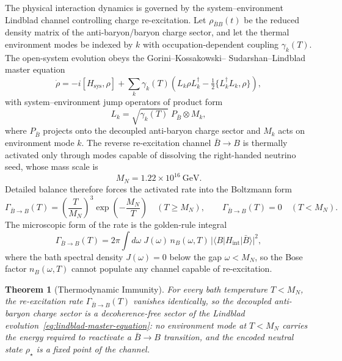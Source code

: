 \documentclass[11pt,letterpaper]{article}
\theoremstyle{plain}
\newtheorem{theorem}{Theorem}
\begin{document}
The physical interaction dynamics is governed by the system--environment Lindblad channel
controlling charge re-excitation.  Let \(\rho_{\bar B B}(t)\) be the reduced
density matrix of the anti-baryon/baryon charge sector, and let the thermal
environment modes be indexed by \(k\) with occupation-dependent coupling
\(\gamma_k(T)\).  The open-system evolution obeys the Gorini--Kossakowski--
Sudarshan--Lindblad master equation
\begin{equation}
\label{eq:lindblad-master-equation}
 \dot\rho
 =
 -i[H_{\mathrm{sys}},\rho]
 +
 \sum_k
 \gamma_k(T)
 \left(
  L_k\rho L_k^{\dagger}
  -
  \tfrac12\{L_k^{\dagger}L_k,\rho\}
 \right),
\end{equation}
with system--environment jump operators of product form
\begin{equation}
\label{eq:lindblad-jump-operators}
 L_k
 =
 \sqrt{\gamma_k(T)}\;
 P_{\bar B}\otimes M_k,
\end{equation}
where \(P_{\bar B}\) projects onto the decoupled anti-baryon charge sector and
\(M_k\) acts on environment mode \(k\).  The reverse re-excitation channel
\(\bar B\to B\) is thermally activated only through modes capable of
dissolving the right-handed neutrino seed, whose mass scale is
\begin{equation}
\label{eq:seed-mass-scale}
 M_N = 1.22\times10^{16}\ \mathrm{GeV}.
\end{equation}
Detailed balance therefore forces the activated rate into the Boltzmann form
\begin{equation}
\label{eq:thermal-immunity-rate}
 \Gamma_{\bar B\to B}(T)
 =
 \left(\frac{T}{M_N}\right)^{3}
 \exp\!\left(-\frac{M_N}{T}\right)
 \quad (T\ge M_N),
 \qquad
 \Gamma_{\bar B\to B}(T)=0
 \quad (T<M_N).
\end{equation}
The microscopic form of the rate is the golden-rule integral
\begin{equation}
\label{eq:lindblad-rate-golden-rule}
 \Gamma_{\bar B\to B}(T)
 =
 2\pi\int d\omega\;
 J(\omega)\,n_{B}(\omega,T)\,
 \big|\langle B|H_{\mathrm{int}}|\bar B\rangle\big|^{2},
\end{equation}
where the bath spectral density \(J(\omega)=0\) below the gap
\(\omega<M_N\), so the Bose factor \(n_B(\omega,T)\) cannot populate any
channel capable of re-excitation.

\begin{theorem}[Thermodynamic Immunity]
\label{thm:thermodynamic-immunity}
For every bath temperature \(T<M_N\), the re-excitation rate
\(\Gamma_{\bar B\to B}(T)\) vanishes identically, so the decoupled
anti-baryon charge sector is a decoherence-free sector of the Lindblad
evolution~\eqref{eq:lindblad-master-equation}: no environment mode at
\(T<M_N\) carries the energy required to reactivate a \(\bar B\to B\)
transition, and the encoded neutral state \(\rho_\star\) is a fixed point of
the channel.
\end{theorem}
\end{document}
